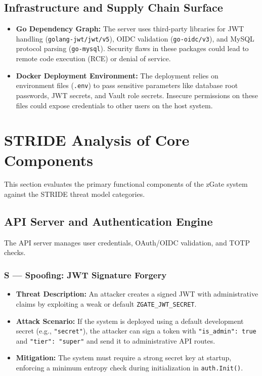 \subsection{Infrastructure and Supply Chain Surface}
\begin{itemize}[leftmargin=*]
    \item \textbf{Go Dependency Graph:} The server uses third-party libraries for JWT handling (\texttt{golang-jwt/jwt/v5}), OIDC validation (\texttt{go-oidc/v3}), and MySQL protocol parsing (\texttt{go-mysql}). Security flaws in these packages could lead to remote code execution (RCE) or denial of service.
    \item \textbf{Docker Deployment Environment:} The deployment relies on environment files (\texttt{.env}) to pass sensitive parameters like database root passwords, JWT secrets, and Vault role secrets. Insecure permissions on these files could expose credentials to other users on the host system.
\end{itemize}

\section{STRIDE Analysis of Core Components}

This section evaluates the primary functional components of the zGate system against the STRIDE threat model categories.

\subsection{API Server and Authentication Engine}

The API server manages user credentials, OAuth/OIDC validation, and TOTP checks.

\subsubsection{S --- Spoofing: JWT Signature Forgery}
\begin{itemize}[leftmargin=*]
    \item \textbf{Threat Description:} An attacker creates a signed JWT with administrative claims by exploiting a weak or default \texttt{ZGATE\_JWT\_SECRET}.
    \item \textbf{Attack Scenario:} If the system is deployed using a default development secret (e.g., \texttt{"secret"}), the attacker can sign a token with \texttt{"is\_admin": true} and \texttt{"tier": "super"} and send it to administrative API routes.
    \item \textbf{Mitigation:} The system must require a strong secret key at startup, enforcing a minimum entropy check during initialization in \texttt{auth.Init()}.
\end{itemize}

